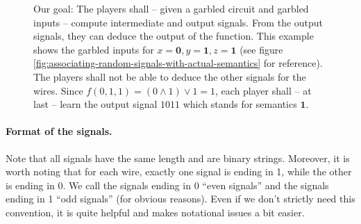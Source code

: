 \message{ !name(seminar.tex)}\documentclass{llncs}
\begin{document}
\begin{figure}[t]
  \centering
  \caption{Our goal: The players shall -- given a garbled circuit and garbled inputs -- compute intermediate and output signals. From the output signals, they can deduce the output of the function. This example shows the garbled inputs for $x=\mathbf{0}, y=\mathbf{1}, z=\mathbf{1}$ (see figure \ref{fig:associating-random-signals-with-actual-semantics} for reference). The players shall not be able to deduce the other signals for the wires. Since $f(0,1,1) = (0\wedge 1) \vee 1 = 1$, each player shall -- at last -- learn the output signal $1011$ which stands for semantics $\mathbf{1}$.}
  \label{fig:sample-computation}
\end{figure}


\paragraph{Format of the signals.}

Note that all signals have the same length and are binary strings. Moreover, it is worth noting that for each wire, exactly one signal is ending in 1, while the other is ending in 0. We call the signals ending in 0 ``even signals'' and the signals ending in 1 ``odd signals'' (for obvious reasons). Even if we don't strictly need this convention, it is quite helpful and makes notational issues a bit easier.
\end{document}
